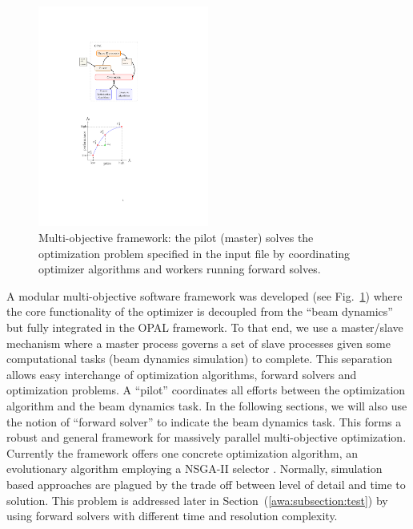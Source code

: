 \documentclass[preprint,linenumbers,amsmath,amssymb,aps,prstab]{revtex4-1}%
\begin{document}
\begin{figure}%
	\center
\includegraphics[width=0.5\textwidth]{figures/opt-framework_code}
\caption{Multi-objective framework: the pilot (master) solves the
	optimization problem specified in the input file by coordinating optimizer
	algorithms and workers running forward solves.}
\label{fig:framenetwork}
\end{figure}

A modular multi-objective software framework was developed (see
 Fig.~\ref{fig:framenetwork}) where the core functionality of the optimizer is decoupled from
 the ``beam dynamics'' but fully integrated in the OPAL framework. 
To that end, we use a master/slave mechanism where a master process governs a
 set of slave processes given some computational tasks (beam dynamics simulation) to complete.
This separation allows easy interchange of optimization algorithms, forward
  solvers and optimization problems.
A ``pilot'' coordinates all efforts between the optimization algorithm and the
  beam dynamics task. In the following sections, we will also use the notion of ``forward solver'' to indicate the beam dynamics task.
This forms a robust and general framework for massively parallel
  multi-objective optimization.
Currently the framework offers one concrete optimization algorithm, an
  evolutionary algorithm employing a \textsc{NSGA-II} selector \cite{pisa}.
Normally, simulation based approaches are plagued by the trade off between
  level of detail and time to solution.
This problem is addressed later in Section~(\ref{awa:subsection:test}) by using forward solvers with different time and
  resolution complexity.
\end{document}

